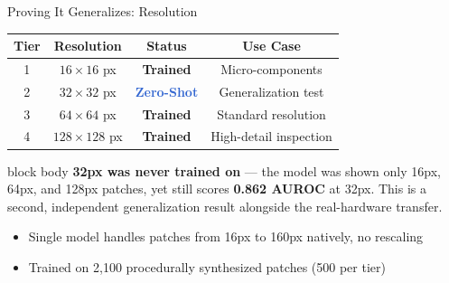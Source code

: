 \documentclass[aspectratio=169, 11pt]{beamer}
\newcommand{\emphred}[1]{\textcolor{secondary}{#1}}
\begin{document}
\begin{frame}{\emphred{Proving It Generalizes: Resolution}}
    \begin{center}
        \begin{tabular}{|c|c|c|c|}
            \hline
            \textbf{\emphred{Tier}} & \textbf{Resolution} & \textbf{Status} & \textbf{Use Case} \\
            \hline
            1 & $16 \times 16$ px & \textcolor{accent}{\textbf{Trained}} & Micro-components \\
            \hline
            2 & $32 \times 32$ px & \textcolor{highlight}{\textbf{Zero-Shot}} & Generalization test \\
            \hline
            3 & $64 \times 64$ px & \textcolor{accent}{\textbf{Trained}} & Standard resolution \\
            \hline
            4 & $128 \times 128$ px & \textcolor{accent}{\textbf{Trained}} & High-detail inspection \\
            \hline
        \end{tabular}
    \end{center}

    \vspace{0.6cm}
    \begin{beamercolorbox}[wd=0.9\paperwidth,rounded=true,sep=0.6em]{block body}
        \textbf{32px was never trained on} --- the model was shown only 16px, 64px, and 128px patches, yet still scores \textbf{0.862 AUROC} at 32px. This is a second, independent generalization result alongside the real-hardware transfer.
    \end{beamercolorbox}

    \vspace{0.4cm}
    \begin{itemize}
        \item Single model handles patches from 16px to 160px natively, no rescaling
        \item Trained on 2,100 procedurally synthesized patches (500 per tier)
    \end{itemize}
\end{frame}
\end{document}
